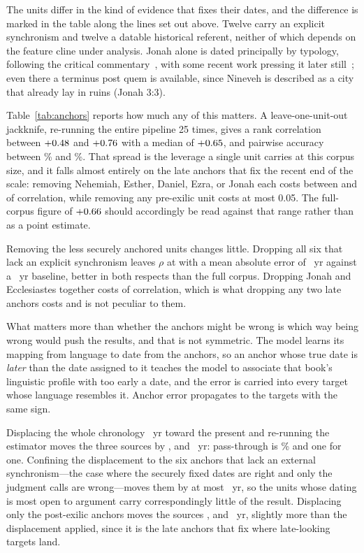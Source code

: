 \documentclass[10pt,letterpaper]{article}
\begin{document}
The units differ in the kind of evidence that fixes their dates, and the
difference is marked in the table along the lines set out above.  Twelve carry an
explicit synchronism and twelve a datable historical referent, neither of which
depends on the feature cline under analysis.  Jonah alone is dated principally
by typology, following the critical commentary~\cite{Wolff1986}, with some
recent work pressing it later still~\cite{Dell1996}; even there a terminus post
quem is available, since Nineveh is described as a city that already lay in
ruins (Jonah 3:3).

Table~\ref{tab:anchors} reports how much any of this matters.  A
leave-one-unit-out jackknife, re-running the entire pipeline 25 times, gives a
rank correlation between $+0.48$ and $+0.76$ with a median of
$+0.65$, and pairwise accuracy between \JKpairmin\% and \JKpairmax\%.
That spread is the leverage a single unit carries at this corpus size, and it
falls almost entirely on the late anchors that fix the recent end of the scale:
removing Nehemiah, Esther, Daniel, Ezra, or Jonah each costs between \JKcostMin{} and
\JKcostMid{} of correlation, while removing any pre-exilic unit costs at most 0.05.  The
full-corpus figure of $+0.66$ should accordingly be read against that range
rather than as a point estimate.

Removing the less securely anchored units changes little.  Dropping all six that
lack an explicit synchronism leaves $\rho$ at \ANCrho{} with a mean absolute error
of \ANCmae~yr against a \ANCbase~yr baseline, better in both respects than the full
corpus.  Dropping Jonah and Ecclesiastes together costs \JKcostMax{} of correlation,
which is what dropping any two late anchors costs and is not peculiar to them.

What matters more than whether the anchors might be wrong is which way being
wrong would push the results, and that is not symmetric.  The model learns its
mapping from language to date from the anchors, so an anchor whose true date is
\emph{later} than the date assigned to it teaches the model to associate that
book's linguistic profile with too early a date, and the error is carried into
every target whose language resembles it.  Anchor error propagates to the
targets with the same sign.

Displacing the whole chronology \ABshift~yr toward the present and re-running
the estimator moves the three sources by \ABAllJE, \ABAllD{} and \ABAllP~yr:
pass-through is \ABpass\% and one for one.  Confining the displacement to the
six anchors that lack an external synchronism---the case where the securely
fixed dates are right and only the judgment calls are wrong---moves them by at
most \ABsoftMax~yr, so the units whose dating is most open to argument carry
correspondingly little of the result.  Displacing only the post-exilic anchors
moves the sources \ABLateJE, \ABLateD{} and \ABLateP~yr, slightly more than the
displacement applied, since it is the late anchors that fix where late-looking
targets land.
\end{document}
